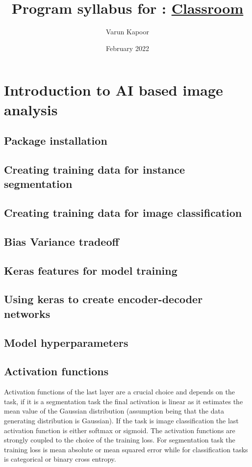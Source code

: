 \documentclass[a4paper,10pt]{article}
\title{Program syllabus for : \href{https://kapoorlabs.org/product/introduction-to-python-with-artificial-intelligence/}{Classroom}}
\author[]{Varun Kapoor}
\affil[]{Kapoorlabs, Paris, France}
\date{February 2022}
\begin{document}
\maketitle

\section{Introduction to AI based image analysis}

\subsection{Package installation \label{install}}
\subsection{Creating training data for instance segmentation \label{td_instance}}
\subsection{Creating training data for image classification\label{td_class}}
\subsection{Bias Variance tradeoff \label{bias_variance}}
\subsection{Keras features for model training \label{keras_train_features}}
\subsection{Using keras to create encoder-decoder networks \label{keras_net}}
\subsection{Model hyperparameters \label{model_hyp}}
\subsection{Activation functions \label{model_act}}
Activation functions of the last layer are a crucial choice and depends on the task, if it is a segmentation task the final activation is linear as it estimates the mean value of the Gaussian distribution (assumption being that the data generating distribution is Gaussian). If the task is image classification the last activation function is either softmax or sigmoid. The activation functions are strongly coupled to the choice of the training loss. For segmentation task the training loss is mean absolute or mean squared error while for classification tasks is categorical or binary cross entropy.
\end{document}
